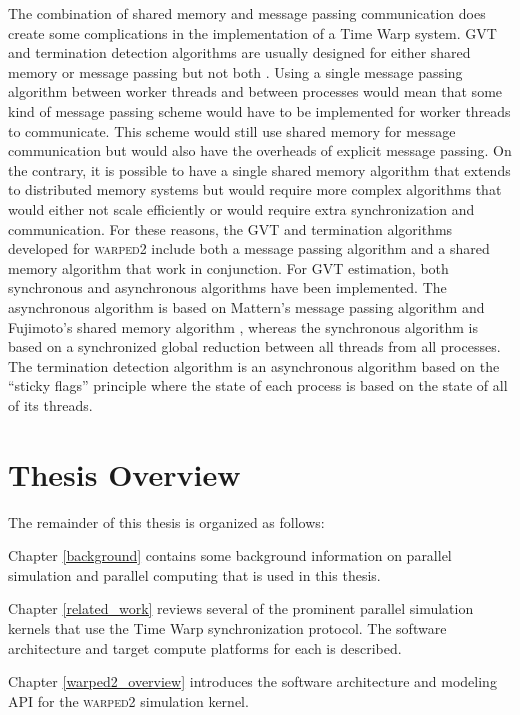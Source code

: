 \documentclass[11pt]{book}
\begin{document}
The combination of shared memory and message passing communication does create some complications in
the implementation of a Time Warp system.  GVT and termination detection algorithms are usually
designed for either shared memory or message passing but not both
\cite{mattern-93,bellenot-90,fujimoto-94}.  Using a single message passing algorithm between
worker threads and between processes would mean that some kind of message passing scheme would have
to be implemented for worker threads to communicate.  This scheme would still use shared memory for
message communication but would also have the overheads of explicit message passing.  On the
contrary, it is possible to have a single shared memory algorithm that extends to distributed memory
systems but would require more complex algorithms that would either not scale efficiently or would
require extra synchronization and communication.  For these reasons, the GVT and termination
algorithms developed for \textsc{warped2} include both a message passing algorithm and a shared
memory algorithm that work in conjunction.  For GVT estimation, both synchronous and asynchronous
algorithms have been implemented.  The asynchronous algorithm is based on Mattern's message passing
algorithm\cite{mattern-93} and Fujimoto's shared memory algorithm \cite{fujimoto-94}, whereas the
synchronous algorithm is based on a synchronized global reduction between all threads from all
processes.  The termination detection algorithm is an asynchronous algorithm based on the ``sticky
flags'' principle\cite{mattern-91} where the state of each process is based on the state of all of
its threads.

\section{Thesis Overview}

The remainder of this thesis is organized as follows:

Chapter \ref{background} contains some background information on parallel simulation and
parallel computing that is used in this thesis.

Chapter \ref{related_work} reviews several of the prominent parallel simulation kernels
that use the Time Warp synchronization protocol.  The software architecture and target
compute platforms for each is described.

Chapter \ref{warped2_overview} introduces the software architecture and modeling API for
the \textsc{warped2} simulation kernel.
\end{document}
